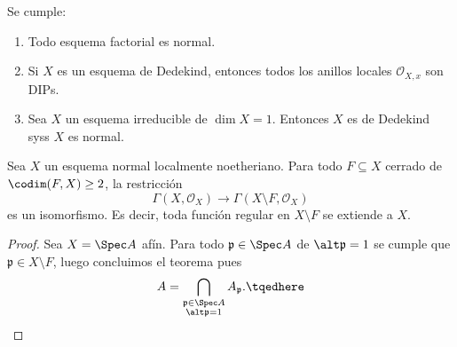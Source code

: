 \begin{prop}
	Se cumple:
	\begin{enumerate}
		\item Todo esquema factorial es normal.
		\item Si $X$ es un esquema de Dedekind, entonces todos los anillos locales $\mathscr{O}_{X, x}$ son DIPs.
		\item Sea $X$ un esquema irreducible de $\dim X = 1$.
			Entonces $X$ es de Dedekind syss $X$ es normal.
	\end{enumerate}
\end{prop}

\begin{thm}
	Sea $X$ un esquema normal localmente noetheriano. Para
	todo $F \subseteq X$ cerrado de $\codim(F, X) \ge 2$, la restricción
	$$ \Gamma(X, \mathscr{O}_X ) \longrightarrow \Gamma(X \setminus F, \mathscr{O}_X ) $$
	es un isomorfismo. Es decir, toda función regular en $X \setminus F$ se extiende a $X$.
\end{thm}
\begin{proof}
	Sea $X = \Spec A$ afín. Para todo $\mathfrak{p} \in \Spec A$ de $\alt\mathfrak{p} = 1$
	se cumple que $\mathfrak{p} \in X \setminus F$, luego concluimos el teorema pues
	\begin{equation}
		A = \bigcap_{\substack{\mathfrak{p} \in \Spec A \\ \alt\mathfrak{p} = 1}} A_{\mathfrak{p}}.
		\tqedhere
	\end{equation}
\end{proof}


